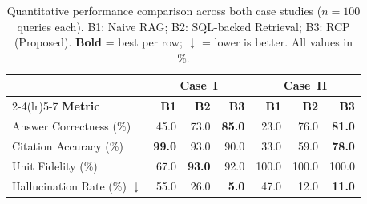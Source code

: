 \documentclass[largeformat]{interact}
\begin{document}
\begin{table}[h]
    \centering
    \caption{Quantitative performance comparison across both case studies ($n = 100$ queries each). B1: Naive RAG; B2: SQL-backed Retrieval; B3: RCP (Proposed). \textbf{Bold} = best per row; $\downarrow$ = lower is better. All values in \%.}
    \label{tab:performance_combined}
    \small
    \setlength{\tabcolsep}{5pt}
    \renewcommand{\arraystretch}{1.1}
    \begin{tabular}{@{}lrrrrrr@{}}
        \toprule
        & \multicolumn{3}{c}{\textbf{Case~I}} & \multicolumn{3}{c}{\textbf{Case~II}} \\
        \cmidrule(lr){2-4}\cmidrule(lr){5-7}
        \textbf{Metric} & \textbf{B1} & \textbf{B2} & \textbf{B3} & \textbf{B1} & \textbf{B2} & \textbf{B3} \\
        \midrule
        Answer Correctness (\%)              & 45.0 & 73.0 & \textbf{85.0} & 23.0 & 76.0 & \textbf{81.0} \\
        Citation Accuracy (\%)              & \textbf{99.0} & 93.0 & 90.0 & 33.0 & 59.0 & \textbf{78.0} \\
        Unit Fidelity (\%)                  & 67.0 & \textbf{93.0} & 92.0 & 100.0 & 100.0 & 100.0 \\
        Hallucination Rate (\%) $\downarrow$ & 55.0 & 26.0 & \textbf{5.0} & 47.0 & 12.0 & \textbf{11.0} \\
        \bottomrule
    \end{tabular}
\end{table}


\end{document}
